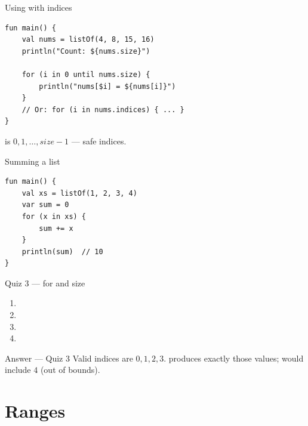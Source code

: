 \documentclass[aspectratio=169,11pt]{beamer}
\begin{document}
    \begin{frame}[fragile]{Using  with indices}
        \begin{lstlisting}
fun main() {
    val nums = listOf(4, 8, 15, 16)
    println("Count: ${nums.size}")

    for (i in 0 until nums.size) {
        println("nums[$i] = ${nums[i]}")
    }
    // Or: for (i in nums.indices) { ... }
}
        \end{lstlisting}
        \vspace{0.3em}
         is $0, 1, \ldots, size-1$ --- safe indices.
    \end{frame}

    \begin{frame}[fragile]{Summing a list}
        \begin{lstlisting}
fun main() {
    val xs = listOf(1, 2, 3, 4)
    var sum = 0
    for (x in xs) {
        sum += x
    }
    println(sum)  // 10
}
        \end{lstlisting}
    \end{frame}

    \begin{frame}{Quiz 3 --- for and size}
        \begin{enumerate}
            \item {}
            \item {}
            \item {}
            \item {}
        \end{enumerate}
        \quizpause
    \end{frame}

    \begin{frame}{Answer --- Quiz 3}
        \vspace{0.4em}
        Valid indices are $0,1,2,3$.
         produces exactly those values;
         would include $4$ (out of bounds).
    \end{frame}

    \section{Ranges}
\end{document}
